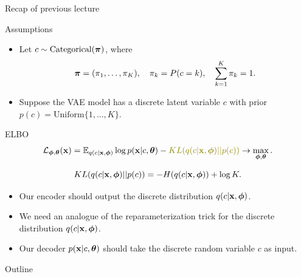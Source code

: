\documentclass{beamer}
\begin{document}
\begin{frame}{Recap of previous lecture}
	\begin{block}{Assumptions}
		\begin{itemize}
			\item Let $c \sim \text{Categorical}(\boldsymbol{\pi})$, where 
			\vspace{-0.6cm}
			\[
			\boldsymbol{\pi} = (\pi_1, \dots, \pi_K), \quad \pi_k = P(c = k), \quad \sum_{k=1}^K \pi_k = 1.
			\]
			\vspace{-0.7cm}
			\item Suppose the VAE model has a discrete latent variable $c$ with prior $p(c) = \text{Uniform}\{1, \dots, K\}$.
		\end{itemize}
	\end{block}
	\begin{block}{ELBO}
		\vspace{-0.6cm}
		\[
			\cL_{\bphi, \btheta}(\bx)  = \mathbb{E}_{q(c | \bx, \bphi)} \log p(\bx | c, \btheta) - {\color{olive} KL(q(c| \bx, \bphi) || p(c))} \rightarrow \max_{\bphi, \btheta}.
		\]
	\end{block}
	\vspace{-1.0cm}
	\[
		KL(q(c| \mathbf{x}, \boldsymbol{\phi}) || p(c)) = - H(q(c | \mathbf{x}, \boldsymbol{\phi})) + \log K. 
	\]		
	\vspace{-0.5cm}
	\begin{itemize}
		\item Our encoder should output the discrete distribution $q(c | \mathbf{x}, \boldsymbol{\phi})$.
		\item We need an analogue of the reparameterization trick for the discrete distribution $q(c | \mathbf{x}, \boldsymbol{\phi})$.
		\item Our decoder $p(\mathbf{x} | c, \boldsymbol{\theta})$ should take the discrete random variable $c$ as input.
	\end{itemize}
\end{frame}
\begin{frame}{Outline}
	\tableofcontents
\end{frame}
\end{document}
